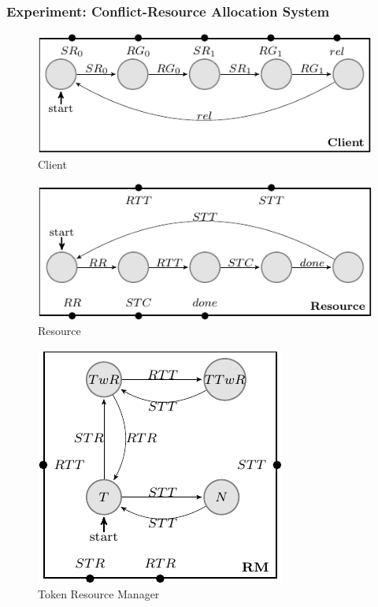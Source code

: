 \subsubsection{Experiment: Conflict-Resource Allocation System}


\begin{figure}[ht]
\begin{center}
\includegraphics[scale=1.2]{compiledfigures/client-crop.pdf}
\caption{Client}
\label{fig:client}
\end{center}
\end{figure}

\begin{figure}[ht]
\begin{center}
\includegraphics[scale=1.2]{compiledfigures/resource-crop.pdf}
\caption{Resource}
\label{fig:resourse}
\end{center}
\end{figure}

\begin{figure}[ht]
\begin{center}
\includegraphics[scale=1.2]{compiledfigures/token-crop.pdf}
\caption{Token Resource Manager}
\label{fig:conflict-token}
\end{center}
\end{figure}

